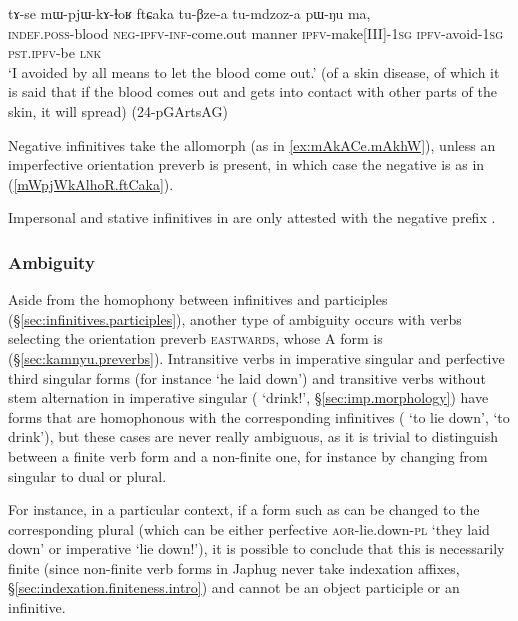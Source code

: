 \begin{exe}
\ex \label{mWpjWkAlhoR.ftCaka}
 \gll  tɤ-se mɯ-pjɯ-kɤ-ɬoʁ ftɕaka tu-βze-a tu-mdzoz-a pɯ-ŋu ma, \\
 \textsc{indef}.\textsc{poss}-blood \textsc{neg}-\textsc{ipfv}-\textsc{inf}-come.out manner \textsc{ipfv}-make[III]-\textsc{1sg} \textsc{ipfv}-avoid-\textsc{1sg} \textsc{pst}.\textsc{ipfv}-be \textsc{lnk} \\
\glt `I avoided by all means to let the blood come out.' (of a skin disease, of which it is said that if the blood comes out and gets into contact with other parts of the skin, it will spread) (24-pGArtsAG) 
 \end{exe}
 
Negative infinitives take the allomorph  (as in \ref{ex:mAkACe.mAkhW}), unless an imperfective orientation preverb is present, in which case the negative is  as in (\ref{mWpjWkAlhoR.ftCaka}).

Impersonal and stative infinitives in  are only attested with the negative prefix .

\subsubsection{Ambiguity}  \label{sec:velar.inf.ambiguity}
Aside from the homophony between infinitives and participles (§\ref{sec:infinitives.participles}), another type of ambiguity occurs with verbs selecting the orientation preverb \textsc{eastwards}, whose A form is  (§\ref{sec:kamnyu.preverbs}). Intransitive verbs in imperative singular and perfective third singular forms (for instance  `he laid down') and transitive verbs without stem alternation in imperative singular ( `drink!', §\ref{sec:imp.morphology}) have forms that are homophonous with the corresponding infinitives ( `to lie down',  `to drink'), but these cases are never really ambiguous, as it is trivial to distinguish between a finite verb form and a non-finite one, for instance by changing from singular to dual or plural. 

For instance, in a particular context, if a form such as  can be changed to the corresponding plural  (which can be either perfective \textsc{aor}-lie.down-\textsc{pl} `they laid down' or imperative `lie down!'), it is possible to conclude that this  is necessarily finite (since non-finite verb forms in Japhug never take indexation affixes, §\ref{sec:indexation.finiteness.intro}) and cannot be an object participle or an infinitive.

